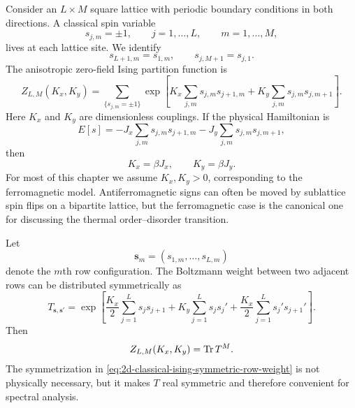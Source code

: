 Consider an $L\times M$ square lattice with periodic boundary conditions in both
directions.  A classical spin variable
\begin{equation}
    s_{j,m}=\pm1,
    \qquad
    j=1,\ldots,L,
    \qquad
    m=1,\ldots,M,
\end{equation}
lives at each lattice site.  We identify
\begin{equation}
    s_{L+1,m}=s_{1,m},
    \qquad
    s_{j,M+1}=s_{j,1}.
\end{equation}
The anisotropic zero-field Ising partition function is
\begin{equation}
\label{eq:2d-classical-ising-partition-function}
    Z_{L,M}(K_x,K_y)
    =
    \sum_{\{s_{j,m}=\pm1\}}
    \exp\left[
        K_x\sum_{j,m}s_{j,m}s_{j+1,m}
        +
        K_y\sum_{j,m}s_{j,m}s_{j,m+1}
    \right].
\end{equation}
Here $K_x$ and $K_y$ are dimensionless couplings.  If the physical Hamiltonian is
\begin{equation}
    E[s]
    =
    -J_x\sum_{j,m}s_{j,m}s_{j+1,m}
    -J_y\sum_{j,m}s_{j,m}s_{j,m+1},
\end{equation}
then
\begin{equation}
    K_x=\beta J_x,
    \qquad
    K_y=\beta J_y .
\end{equation}
For most of this chapter we assume $K_x,K_y>0$, corresponding to the
ferromagnetic model.  Antiferromagnetic signs can often be moved by sublattice
spin flips on a bipartite lattice, but the ferromagnetic case is the canonical
one for discussing the thermal order--disorder transition.

Let
\begin{equation}
    \bm{s}_m=(s_{1,m},\ldots,s_{L,m})
\end{equation}
denote the $m$th row configuration.  The Boltzmann weight between two adjacent
rows can be distributed symmetrically as
\begin{equation}
\label{eq:2d-classical-ising-symmetric-row-weight}
    T_{\bm{s},\bm{s}'}
    =
    \exp\left[
        \frac{K_x}{2}\sum_{j=1}^{L}s_js_{j+1}
        +
        K_y\sum_{j=1}^{L}s_js_j'
        +
        \frac{K_x}{2}\sum_{j=1}^{L}s_j's_{j+1}'
    \right].
\end{equation}
Then
\begin{equation}
\label{eq:2d-classical-ising-z-tr-tm}
    Z_{L,M}(K_x,K_y)=\operatorname{Tr} T^M .
\end{equation}
The symmetrization in \cref{eq:2d-classical-ising-symmetric-row-weight} is not
physically necessary, but it makes $T$ real symmetric and therefore convenient
for spectral analysis.

